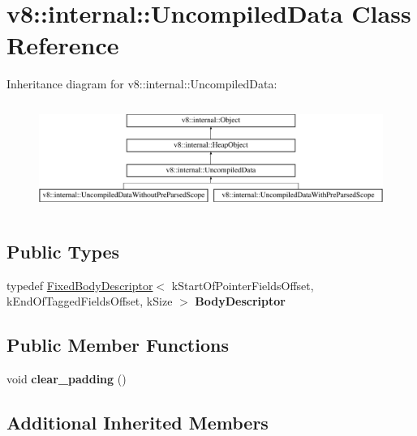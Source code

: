 \hypertarget{classv8_1_1internal_1_1UncompiledData}{}\section{v8\+:\+:internal\+:\+:Uncompiled\+Data Class Reference}
\label{classv8_1_1internal_1_1UncompiledData}
Inheritance diagram for v8\+:\+:internal\+:\+:Uncompiled\+Data\+:\begin{figure}[H]
\begin{center}
\leavevmode
\includegraphics[height=3.544304cm]{classv8_1_1internal_1_1UncompiledData}
\end{center}
\end{figure}
\subsection*{Public Types}
\begin{DoxyCompactItemize}
\item 
\mbox{\label{classv8_1_1internal_1_1UncompiledData_ac1277db7c18dd8a16e6a3a1f8227c620}} 
typedef \mbox{\hyperlink{classv8_1_1internal_1_1FixedBodyDescriptor}{Fixed\+Body\+Descriptor}}$<$ k\+Start\+Of\+Pointer\+Fields\+Offset, k\+End\+Of\+Tagged\+Fields\+Offset, k\+Size $>$ {\bfseries Body\+Descriptor}
\end{DoxyCompactItemize}
\subsection*{Public Member Functions}
\begin{DoxyCompactItemize}
\item 
\mbox{\label{classv8_1_1internal_1_1UncompiledData_a567e6fb0ce47a59c8e989ee375890b62}} 
void {\bfseries clear\+\_\+padding} ()
\end{DoxyCompactItemize}
\subsection*{Additional Inherited Members}


